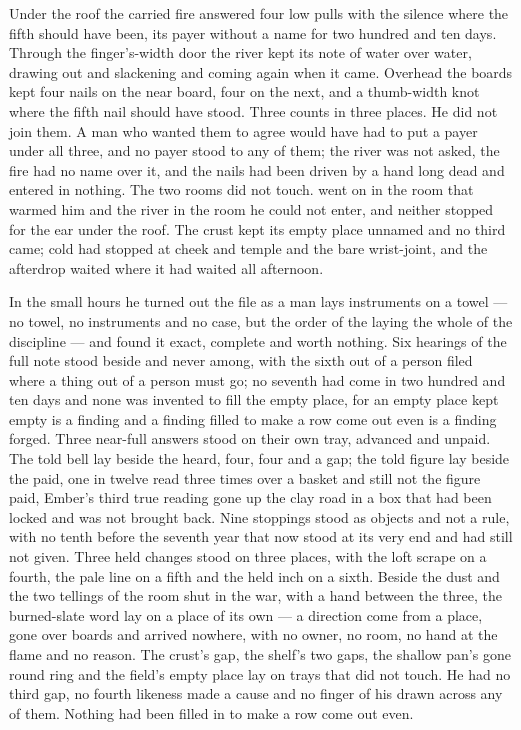 \scenebreak

Under the roof the carried fire answered four low pulls with the silence where the fifth should have been, its payer without a name for two hundred and ten days. Through the finger's-width door the river kept its note of water over water, drawing out and slackening and coming again when it came. Overhead the boards kept four nails on the near board, four on the next, and a thumb-width knot where the fifth nail should have stood. Three counts in three places. He did not join them. A man who wanted them to agree would have had to put a payer under all three, and no payer stood to any of them; the river was not asked, the fire had no name over it, and the nails had been driven by a hand long dead and entered in nothing. The two rooms did not touch.  went on in the room that warmed him and the river in the room he could not enter, and neither stopped for the ear under the roof. The crust kept its empty place unnamed and no third came; cold had stopped at cheek and temple and the bare wrist-joint, and the afterdrop waited where it had waited all afternoon.

\scenebreak

In the small hours he turned out the file as a man lays instruments on a towel --- no towel, no instruments and no case, but the order of the laying the whole of the discipline --- and found it exact, complete and worth nothing. Six hearings of the full note stood beside and never among, with the sixth out of a person filed where a thing out of a person must go; no seventh had come in two hundred and ten days and none was invented to fill the empty place, for an empty place kept empty is a finding and a finding filled to make a row come out even is a finding forged. Three near-full answers stood on their own tray, advanced and unpaid. The told bell lay beside the heard, four, four and a gap; the told figure lay beside the paid, one in twelve read three times over a basket and still not the figure paid, Ember's third true reading gone up the clay road in a box that had been locked and was not brought back. Nine stoppings stood as objects and not a rule, with no tenth before the seventh year that now stood at its very end and had still not given. Three held changes stood on three places, with the loft scrape on a fourth, the pale line on a fifth and the held inch on a sixth. Beside the dust and the two tellings of the room shut in the war, with a hand between the three, the burned-slate word lay on a place of its own --- a direction come from a place, gone over boards and arrived nowhere, with no owner, no room, no hand at the flame and no reason. The crust's gap, the shelf's two gaps, the shallow pan's gone round ring and the field's empty place lay on trays that did not touch. He had no third gap, no fourth likeness made a cause and no finger of his drawn across any of them. Nothing had been filled in to make a row come out even.

